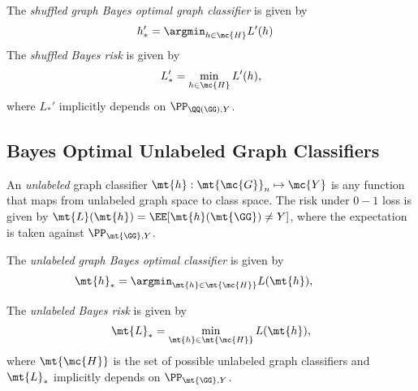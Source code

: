 \documentclass[10pt,journal,cspaper,compsoc]{IEEEtran}
\begin{document}
The \emph{shuffled graph Bayes optimal graph classifier} is given by
\begin{align}
	h_*' &= \argmin_{h \in \mc{H}} L'(h) %
\end{align}
The \emph{shuffled Bayes risk} is given by
\begin{align}
	L_*' =\min_{h \in \mc{H}} L'(h),
\end{align}
where  $L_*'$ implicitly depends on $\PP_{\QQ(\GG),Y}$.  %

\subsection{Bayes Optimal Unlabeled Graph Classifiers} %


An \emph{unlabeled} graph classifier $\mt{h}: \mt{\mc{G}}_n \mapsto \mc{Y}$ is any function that maps from unlabeled graph space to class space. The risk under $0-1$ loss is given by $\mt{L}(\mt{h})=\EE[\mt{h}(\mt{\GG})\neq Y]$, where the expectation is taken against $\PP_{\mt{\GG},Y}$. 

The \emph{unlabeled graph Bayes optimal classifier} is given by %
\begin{align}
	\mt{h}_* &= \argmin_{\mt{h} \in \mt{\mc{H}}} L(\mt{h}), \qquad %
\end{align}



The \emph{unlabeled Bayes risk} is given by %
\begin{align}
	\mt{L}_* =\min_{\mt{h} \in \mt{\mc{H}}} L(\mt{h}),
\end{align}
where $\mt{\mc{H}}$ is the set of possible unlabeled graph classifiers
and $\mt{L}_*$ implicitly depends on $\PP_{\mt{\GG},Y}$.  

\end{document}
